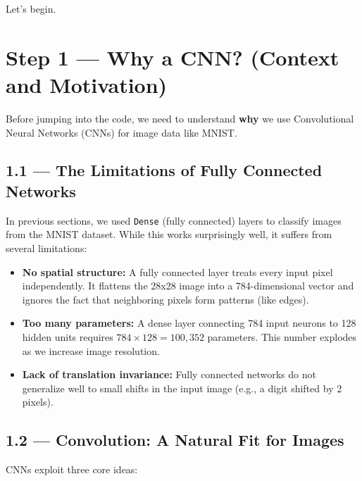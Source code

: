 \documentclass[11pt]{article}
\begin{document}
\vspace{1em}

Let’s begin.

\newpage


\section*{Step 1 — Why a CNN? (Context and Motivation)}

Before jumping into the code, we need to understand \textbf{why} we use Convolutional Neural Networks (CNNs) for image data like MNIST.

\subsection*{\textbf{1.1 — The Limitations of Fully Connected Networks}}

In previous sections, we used \texttt{Dense} (fully connected) layers to classify images from the MNIST dataset. While this works surprisingly well, it suffers from several limitations:

\begin{itemize}
    \item \textbf{No spatial structure:} A fully connected layer treats every input pixel independently. It flattens the 28x28 image into a 784-dimensional vector and ignores the fact that neighboring pixels form patterns (like edges).
    \item \textbf{Too many parameters:} A dense layer connecting 784 input neurons to 128 hidden units requires $784 \times 128 = 100{,}352$ parameters. This number explodes as we increase image resolution.
    \item \textbf{Lack of translation invariance:} Fully connected networks do not generalize well to small shifts in the input image (e.g., a digit shifted by 2 pixels).
\end{itemize}

\subsection*{\textbf{1.2 — Convolution: A Natural Fit for Images}}

CNNs exploit three core ideas:
\end{document}
